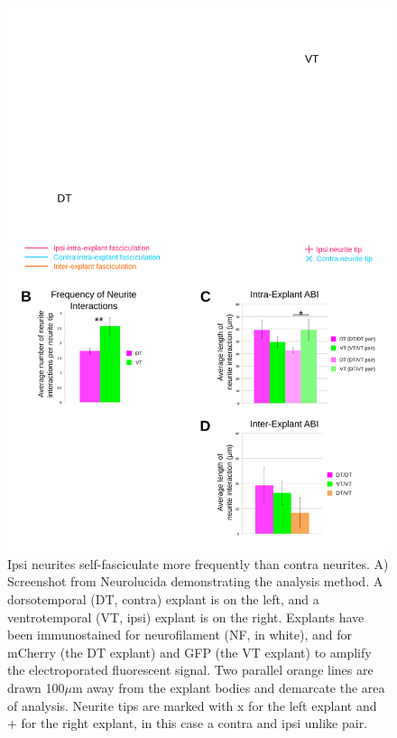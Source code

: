 \begin{figure}[hbtp]
    \begin{center}
        \includegraphics{Figures/EnFaceData.svg}
        \caption[Ipsi neurites self-fasciculate more frequently than contra neurites.]
        {Ipsi neurites self-fasciculate more frequently than contra neurites.
		A) Screenshot from Neurolucida demonstrating the analysis method.
		A dorsotemporal (DT, contra) explant is on the left, and a ventrotemporal (VT, ipsi) explant is on the right.
		Explants have been immunostained for neurofilament (NF, in white), and for mCherry (the DT explant) and GFP (the VT explant) to amplify the electroporated fluorescent signal.
		Two parallel orange lines are drawn 100$\mu$m away from the explant bodies and demarcate the area of analysis.
		Neurite tips are marked with x for the left explant and + for the right explant, in this case a contra and ipsi unlike pair.
}
\end{center}
\end{figure}
